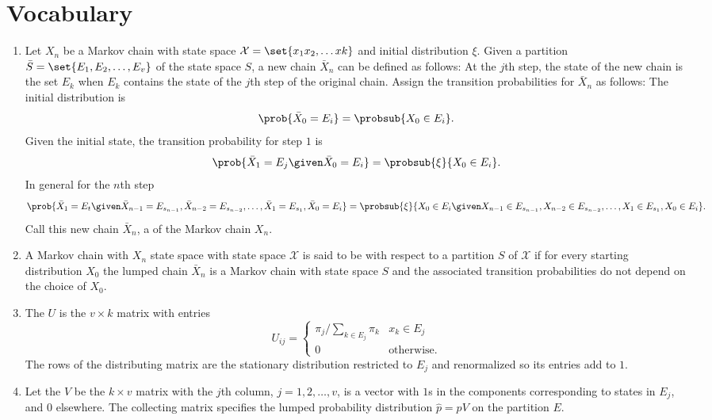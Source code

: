 \documentclass[12pt]{article}
\begin{document}
\hr

\section*{Vocabulary}
\begin{enumerate}
  \item   Let $X_n$ be a Markov chain with state space \( \mathcal{X} =
\set{x_1 x_2, \dots x k} \) and initial distribution \( \xi \). Given a
partition \( \bar{S} = \set{E_1, E_2,  \dots, E_v} \) of the state space
  $S$, a new chain \( \bar{X}_n \) can be defined as
follows: At the $j$th step, the state of the new chain is the set
$E_k$ when $E_k$ contains the state of the $j$th step of the original
chain. Assign the transition probabilities for $\bar{X}_n$ as follows:
The initial distribution is
\[
  \prob{\bar{X}_0 = E_i} = \probsub{X_0 \in E_i}.
\]
Given the initial state, the transition probability for step $1$ is
\[
  \prob{\bar{X}_1 = E_j \given \bar{X}_0 = E_i} = \probsub{\xi}{X_0
  \in E_i }.
\]
In general for the $n$th step
\[
  \prob{\bar{X}_1 = E_t \given \bar{X}_{n-1} = E_{s_{n-1}},
    \bar{X}_{n-2} = E_{s_{n-2}}, \dots,  \bar{X}_1 = E_{s_1},
    \bar{X}_0 = E_i} = \probsub{\xi}{X_0 \in E_i \given X_{n-1} \in E_{s_{n-1}},
    X_{n-2} \in E_{s_{n-2}}, \dots,  X_1 \in E_{s_1},
    X_0 \in E_i}.
\]
Call this new chain \( \bar{X}_n \), a  of the
Markov chain \( X_n \).
  \item 
  A Markov chain with $X_n$ state space with state space $\mathcal{X}$
  is said to be  with respect to a partition $S$ of
  $\mathcal{X}$ if for every starting distribution \( X_0 \) the lumped chain \(
  \bar{X}_n \) is a Markov chain with state space $S$ and the
  associated transition probabilities do not depend on the choice of
  $X_0$.  
\item The  $U$ is the $v \times k$ matrix with entries
\[
  U_{ij} =
  \begin{cases}
    \pi_j/\sum_{k \in E_j} \pi_k & x_k \in E_j \\
    0                            & \text{otherwise}.
  \end{cases}
\]
The rows of the distributing matrix are the stationary
distribution restricted to $E_j$ and renormalized so its entries add
to $1$.
\item Let the  $V$ be the $k \times v$ matrix with the $j$th column,
\( j = 1, 2, \dots, v \), is a vector with $1$s in the components corresponding to
states in $E_j$, and $0$ elsewhere.  The collecting matrix specifies
the lumped probability distribution $\hat{p} = p V$ on the partition
$E$.
\end{enumerate}
\end{document}
